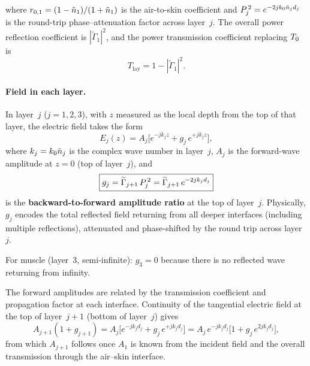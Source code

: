 \noindent
where $r_{0,1} = (1 - \tilde{n}_1)/(1 + \tilde{n}_1)$ is the air-to-skin
coefficient and $P_j^{\,2} = e^{-2jk_0\tilde{n}_j d_j}$ is the round-trip
phase--attenuation factor across layer~$j$.  The overall power reflection
coefficient is $|\widetilde{\Gamma}_1|^2$, and the power transmission
coefficient replacing $T_0$ is
\begin{equation}\label{eq:T-layered}
  T_{\mathrm{lay}} = 1 - |\widetilde{\Gamma}_1|^2.
\end{equation}

\paragraph{Field in each layer.}
In layer~$j$ ($j = 1, 2, 3$), with $z$ measured as the local depth from
the top of that layer, the electric field takes the form
\begin{equation}\label{eq:Ej-layer}
  E_j(z) = A_j\bigl[e^{-jk_j z} + g_j\,e^{+jk_j z}\bigr],
\end{equation}
where $k_j = k_0\tilde{n}_j$ is the complex wave number in layer~$j$,
$A_j$ is the forward-wave amplitude at $z = 0$ (top of layer~$j$), and
\begin{equation}\label{eq:gj-def}
  \boxed{%
    g_j = \widetilde{\Gamma}_{j+1}\,P_j^{\,2}
    = \widetilde{\Gamma}_{j+1}\,e^{-2jk_j d_j}
  }
\end{equation}
is the \textbf{backward-to-forward amplitude ratio} at the top of
layer~$j$.  Physically, $g_j$ encodes the total reflected field returning
from all deeper interfaces (including multiple reflections), attenuated
and phase-shifted by the round trip across layer~$j$.

For muscle (layer~3, semi-infinite): $g_3 = 0$ because there is no
reflected wave returning from infinity.

\begin{remark}
The forward amplitudes are related by the transmission coefficient and
propagation factor at each interface.  Continuity of the tangential
electric field at the top of layer~$j+1$ (bottom of layer~$j$) gives
\begin{equation}\label{eq:Aj-recursion}
  A_{j+1}(1 + g_{j+1})
  = A_j\bigl[e^{-jk_j d_j} + g_j\,e^{+jk_j d_j}\bigr]
  = A_j\,e^{-jk_j d_j}\bigl[1 + g_j\,e^{2jk_j d_j}\bigr],
\end{equation}
from which $A_{j+1}$ follows once $A_1$ is known from the incident field
and the overall transmission through the air--skin interface.
\end{remark}


